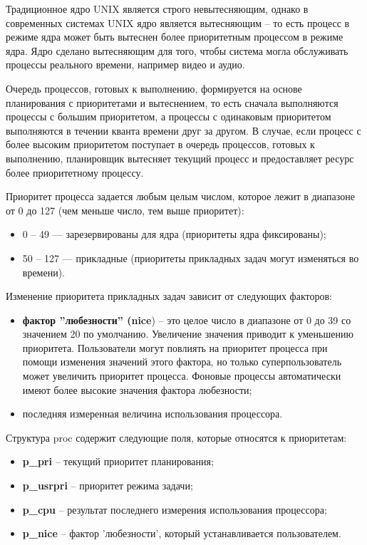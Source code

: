\documentclass[a4paper,14pt,russian]{extreport}
\begin{document}
	Традиционное ядро UNIX является строго невытесняющим, однако в современных системах UNIX ядро является вытесняющим – то есть процесс в режиме ядра может быть вытеснен более приоритетным процессом в режиме ядра.
	Ядро сделано вытесняющим для того, чтобы система могла обслуживать процессы реального времени, например видео и аудио.
	
	Очередь процессов, готовых к выполнению, формируется на основе планирования с приоритетами и вытеснением, то есть сначала выполняются процессы с большим приоритетом, а процессы с одинаковым приоритетом выполняются в течении кванта времени друг за другом.
	В случае, если процесс с более высоким приоритетом поступает в очередь процессов, готовых к выполнению, планировщик вытесняет текущий процесс и предоставляет ресурс более приоритетному процессу.
	
	Приоритет процесса задается любым целым числом, которое лежит в диапазоне от 0 до 127 (чем меньше число, тем выше приоритет):
	\begin{itemize}
		\item 0 -- 49 --- зарезервированы для ядра (приоритеты ядра фиксированы);
		\item 50 -- 127 --- прикладные (приоритеты прикладных задач могут изменяться во времени).
	\end{itemize}
	
	Изменение приоритета прикладных задач зависит от следующих факторов:
	\begin{itemize}
		\item \textbf{фактор ”любезности” (nice}) – это целое число в диапазоне от 0 до 39 со значением 20 по умолчанию.
		Увеличение значения приводит к уменьшению приоритета.
		Пользователи могут повлиять на приоритет процесса при помощи изменения значений этого фактора, но только суперпользователь может увеличить приоритет процесса.
		Фоновые процессы автоматически имеют более высокие значения фактора любезности;
		\item последняя измеренная величина использования процессора.
	\end{itemize}

	Структура proc содержит следующие поля, которые относятся к приоритетам:
	\begin{itemize}
		\item \textbf{p\_pri} – текущий приоритет планирования;
		\item \textbf{p\_usrpri} – приоритет режима задачи;
		\item \textbf{p\_cpu} – результат последнего измерения использования процессора;
		\item \textbf{p\_nice} – фактор ’любезности’, который устанавливается пользователем.
	\end{itemize}
\end{document}
